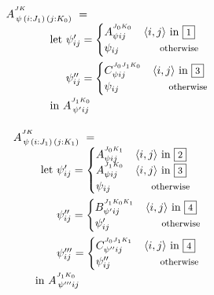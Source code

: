 \begin{equation}\LeftEqNo
\renewcommand\arraystretch{1.5}
\begin{array}{@{}l@{}l}
    \lspan2{
	A^{^{JK}}_{\,\psi\,(i : J_1)\,(j : K_0)} ~=~ } \\
	\qqquad
	\textrm{let}~ & \psi'_{ij} = \begin{cases}
	  A^{^{J_0K_0}}_{\psi ij} & \langle i,j\rangle\mbox{ in }\qbox1 \\
	  \psi_{ij} & \otherwise
	\end{cases} \\[1.2em]
	& \psi''_{ij} = \begin{cases}
	  C^{^{J_0J_1K_0}}_{\psi ij} & \langle i,j\rangle\mbox{ in }\qbox3 \\
	  \psi_{ij} & \otherwise
	\end{cases} \\
	\lspan2{
	\qqquad\textrm{in}~
	A^{^{J_1K_0}}_{\,\psi' ij} }
\end{array}
\label{intro:let in A 3 using C}
\end{equation}

\begin{equation}\LeftEqNo
\renewcommand\arraystretch{1.5}
\begin{array}{l@{}l}
	\lspan2{A^{^{JK}}_{\,\psi\,(i : J_1)\,(j : K_1)} ~=~} \\
	\qquad
	\textrm{let}~ & \psi'_{ij} = \begin{cases}
	  A^{^{J_0K_1}}_{\psi ij} & \langle i,j\rangle\mbox{ in }\qbox2 \\
	  A^{^{J_1K_0}}_{\psi ij} & \langle i,j\rangle\mbox{ in }\qbox3 \\
	  \psi_{ij} & \otherwise
	\end{cases} \\[1.8em]
	& \psi''_{ij} = \begin{cases}
	  B^{^{J_1K_0K_1}}_{\psi' ij} & \langle i,j\rangle\mbox{ in }\qbox4 \\
	  \psi'_{ij} & \otherwise
	\end{cases} \\[1.2em]
	& \psi'''_{ij} = \begin{cases}
	  C^{^{J_0J_1K_1}}_{\psi'' ij} & \langle i,j\rangle\mbox{ in }\qbox4 \\
	  \psi''_{ij} & \otherwise
	\end{cases} \\
	\lspan2{
	\qquad\textrm{in}~A^{^{J_1K_0}}_{\,\psi''' ij}
	}
\end{array}
\label{intro:let in A 4 using B,C}
\end{equation}

